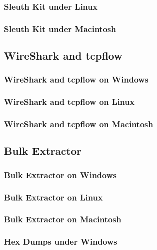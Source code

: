 \subsubsection{Sleuth Kit under Linux}

\subsubsection{Sleuth Kit under Macintosh}

\subsection{WireShark and tcpflow}

\subsubsection{WireShark and tcpflow on Windows}
\subsubsection{WireShark and tcpflow on Linux}
\subsubsection{WireShark and tcpflow on Macintosh}

\subsection{Bulk Extractor}

\subsubsection{Bulk Extractor on Windows}
\subsubsection{Bulk Extractor on Linux}
\subsubsection{Bulk Extractor on Macintosh}


\subsubsection{Hex Dumps under Windows}

